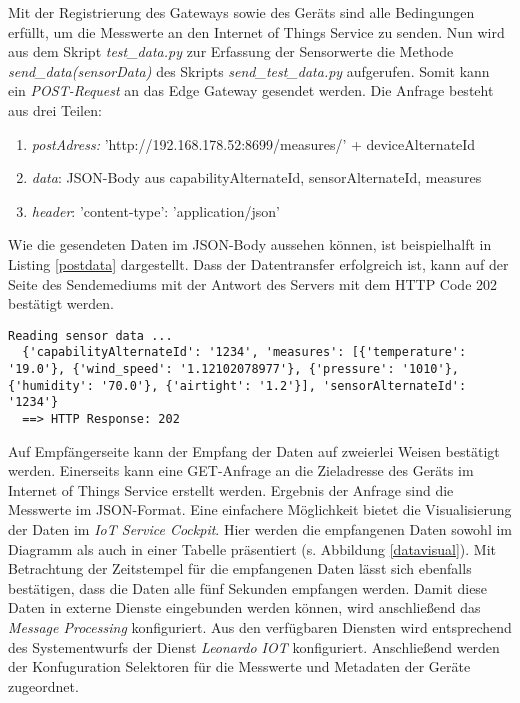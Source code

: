 Mit der Registrierung des Gateways sowie des Geräts sind alle Bedingungen erfüllt, um die Messwerte an den Internet of Things Service zu senden. Nun wird aus dem Skript \textit{test\_data.py} zur Erfassung der Sensorwerte die Methode \textit{send\_data(sensorData)} des Skripts \textit{send\_test\_data.py} aufgerufen. Somit kann ein \textit{POST-Request} an das Edge Gateway gesendet werden. Die Anfrage besteht aus drei Teilen:
\begin{enumerate}
  \item \textit{postAdress:} 'http://192.168.178.52:8699/measures/' + deviceAlternateId
  \item \textit{data}: JSON-Body aus capabilityAlternateId, sensorAlternateId, measures
  \item \textit{header}: 'content-type': 'application/json'
\end{enumerate}

\noindent Wie die gesendeten Daten im JSON-Body aussehen können, ist beispielhalft in Listing \ref{postdata} dargestellt. Dass der Datentransfer erfolgreich ist, kann auf der Seite des Sendemediums mit der Antwort des Servers mit dem HTTP Code 202 bestätigt werden.

\begin{lstlisting}[caption= Das Data-Feld der POST-Anfrage, label=postdata]
  Reading sensor data ...
  {'capabilityAlternateId': '1234', 'measures': [{'temperature': '19.0'}, {'wind_speed': '1.12102078977'}, {'pressure': '1010'}, {'humidity': '70.0'}, {'airtight': '1.2'}], 'sensorAlternateId': '1234'}
  ==> HTTP Response: 202 \end{lstlisting}

\noindent Auf Empfängerseite kann der Empfang der Daten auf zweierlei Weisen bestätigt werden. Einerseits kann eine GET-Anfrage an die Zieladresse des Geräts im Internet of Things Service erstellt werden. Ergebnis der Anfrage sind die Messwerte im JSON-Format. Eine einfachere Möglichkeit bietet die Visualisierung der Daten im \textit{IoT Service Cockpit}. Hier werden die empfangenen Daten sowohl im Diagramm als auch in einer Tabelle präsentiert (s. Abbildung \ref{datavisual}). Mit Betrachtung der Zeitstempel für die empfangenen Daten lässt sich ebenfalls bestätigen, dass die Daten alle fünf Sekunden empfangen werden. Damit diese Daten in externe Dienste eingebunden werden können, wird anschließend das \textit{Message Processing} konfiguriert. Aus den verfügbaren Diensten wird entsprechend des Systementwurfs der Dienst \textit{\glqq Leonardo IOT\grqq{}} konfiguriert. Anschließend werden der Konfuguration Selektoren für die Messwerte und Metadaten der Geräte zugeordnet.

